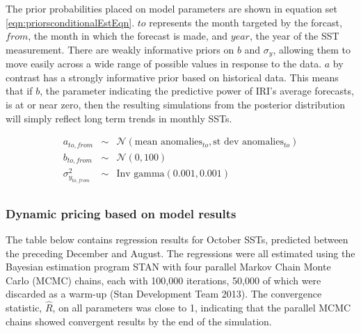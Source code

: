 \documentclass[article]{jss}
\begin{document}
The prior probabilities placed on model parameters are shown in equation
set \ref{eqn:priorsconditionalEstEqn}. \(to\) represents the month
targeted by the forcast, \(from\), the month in which the forecast is
made, and \(year\), the year of the SST measurement. There are weakly
informative priors on \(b\) and \(\sigma_{y}\), allowing them to move
easily across a wide range of possible values in response to the data.
\(a\) by contrast has a strongly informative prior based on historical
data. This means that if \(b\), the parameter indicating the predictive
power of IRI's average forecasts, is at or near zero, then the resulting
simulations from the posterior distribution will simply reflect long
term trends in monthly SSTs.

\begin{equation}
\begin{array}{lcl}
a_{to,from}  & \sim & \mathcal{N}(\mbox{mean anomalies}_{to}, \mbox{st dev anomalies}_{to}) \\
b_{to,from}  & \sim & \mathcal{N}(0, 100) \\
\sigma_{y_{to,from}}^2 & \sim  &\mbox{Inv gamma}(0.001, 0.001) \\
\end{array}
\label{eqn:priorsconditionalEstEqn}
\end{equation}

\subsubsection{Dynamic pricing based on model
results}\label{dynamic-pricing-based-on-model-results}

The table below contains regression results for October SSTs, predicted
between the preceding December and August. The regressions were all
estimated using the Bayesian estimation program STAN with four parallel
Markov Chain Monte Carlo (MCMC) chains, each with 100,000 iterations,
50,000 of which were discarded as a warm-up (Stan Development Team
2013). The convergence statistic, \(\hat{R}\), on all parameters was
close to 1, indicating that the parallel MCMC chains showed convergent
results by the end of the simulation.
\end{document}
